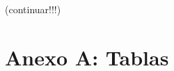 \documentclass[%
	final,
	reprint,
	notitlepage,
	narroweqnarray,
	inline,
	twoside,
	invited
	]{ieee}
\begin{document}
(continuar!!!)


%
%
%
%
%











\clearpage

\onecolumn

\onecolumn
\section*{Anexo A: Tablas}
\end{document}
